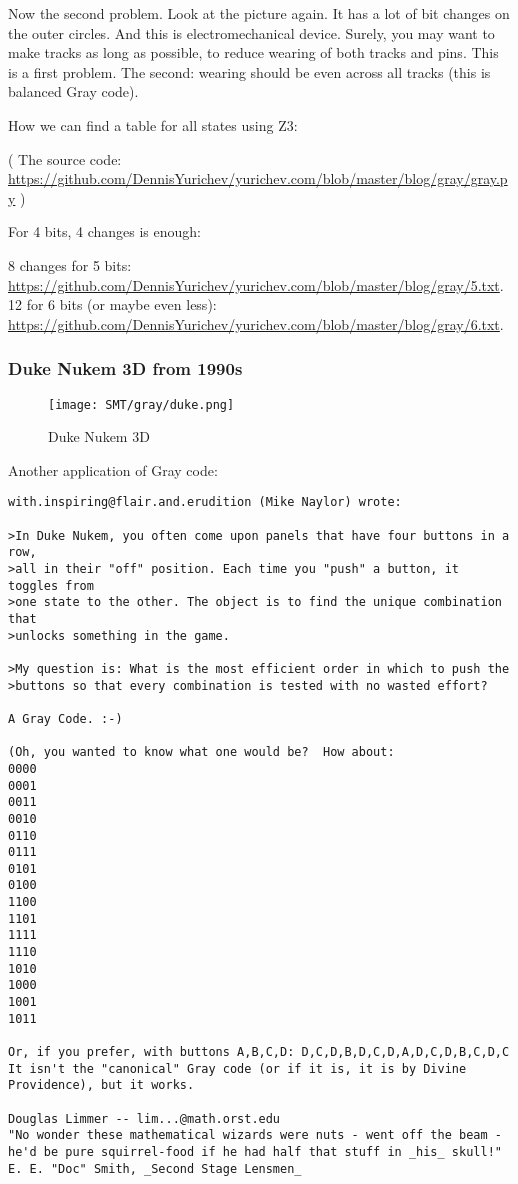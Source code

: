 Now the second problem. Look at the picture again. It has a lot of bit changes on the outer circles.
And this is electromechanical device.
Surely, you may want to make tracks as long as possible, to reduce wearing of both tracks and pins.
This is a first problem.
The second: wearing should be even across all tracks (this is balanced Gray code).

How we can find a table for all states using Z3:



( The source code: \url{https://github.com/DennisYurichev/yurichev.com/blob/master/blog/gray/gray.py} )

For 4 bits, 4 changes is enough:



8 changes for 5 bits: \url{https://github.com/DennisYurichev/yurichev.com/blob/master/blog/gray/5.txt}.
12 for 6 bits (or maybe even less): 
\url{https://github.com/DennisYurichev/yurichev.com/blob/master/blog/gray/6.txt}.

\subsubsection{Duke Nukem 3D from 1990s}

\begin{figure}[H]
\centering
\texttt{[image: SMT/gray/duke.png]}
\caption{Duke Nukem 3D}
\end{figure}

Another application of Gray code:

\begin{lstlisting}
with.inspiring@flair.and.erudition (Mike Naylor) wrote:

>In Duke Nukem, you often come upon panels that have four buttons in a row,
>all in their "off" position. Each time you "push" a button, it toggles from
>one state to the other. The object is to find the unique combination that
>unlocks something in the game.

>My question is: What is the most efficient order in which to push the
>buttons so that every combination is tested with no wasted effort?

A Gray Code. :-)

(Oh, you wanted to know what one would be?  How about:
0000
0001
0011
0010
0110
0111
0101
0100
1100
1101
1111
1110
1010
1000
1001
1011

Or, if you prefer, with buttons A,B,C,D: D,C,D,B,D,C,D,A,D,C,D,B,C,D,C
It isn't the "canonical" Gray code (or if it is, it is by Divine
Providence), but it works.

Douglas Limmer -- lim...@math.orst.edu
"No wonder these mathematical wizards were nuts - went off the beam -
he'd be pure squirrel-food if he had half that stuff in _his_ skull!"
E. E. "Doc" Smith, _Second Stage Lensmen_
\end{lstlisting}

